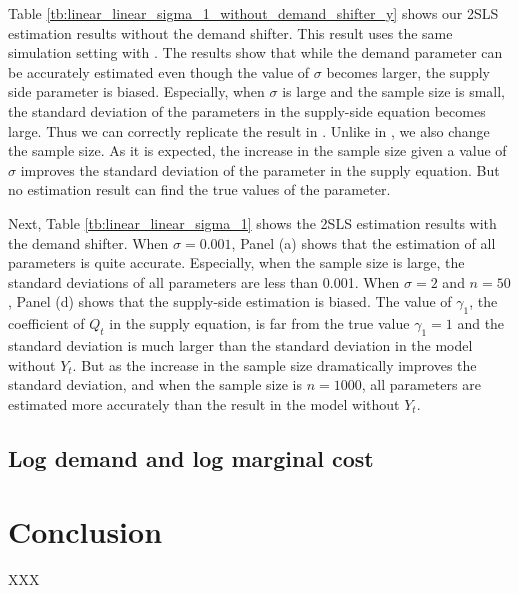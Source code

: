 \documentclass[11pt, a4paper]{article}
\begin{document}
Table \ref{tb:linear_linear_sigma_1_without_demand_shifter_y} shows our 2SLS estimation results without the demand shifter. 
This result uses the same simulation setting with \citet{perloff2012collinearity}.
The results show that while the demand parameter can be accurately estimated even though the value of $\sigma$ becomes larger, the supply side parameter is biased.
Especially, when $\sigma$ is large and the sample size is small, the standard deviation of the parameters in the supply-side equation becomes large.
Thus we can correctly replicate the result in \citet{perloff2012collinearity}.
Unlike in \cite{perloff2012collinearity}, we also change the sample size.
As it is expected, the increase in the sample size given a value of $\sigma$ improves the standard deviation of the parameter in the supply equation. 
But no estimation result can find the true values of the parameter.

Next, Table \ref{tb:linear_linear_sigma_1} shows the 2SLS estimation results with the demand shifter.
When $\sigma = 0.001$, Panel (a) shows that the estimation of all parameters is quite accurate.
Especially, when the sample size is large, the standard deviations of all parameters are less than 0.001.
When $\sigma = 2$ and $n = 50$, Panel (d) shows that the supply-side estimation is biased.
The value of $\gamma_1$, the coefficient  of $Q_t$ in the supply equation, is far from the true value $\gamma_1 = 1$ and the standard deviation is much larger than the standard deviation in the model without $Y_t$.
But as the increase in the sample size dramatically improves the standard deviation, and when the sample size is $n = 1000$, all parameters are estimated more accurately than the result in the model without $Y_t$.





\subsection{Log demand and log marginal cost}



    
\section{Conclusion}

XXX

\appendix
\end{document}
